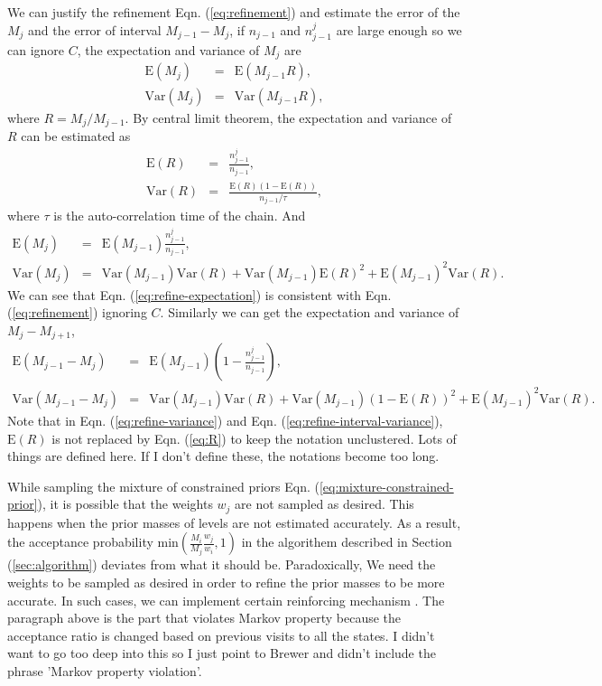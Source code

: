 \documentclass[letterpaper, preprint]{aastex}
\newcommand{\qer}[1]{{\color{red}#1}}
\begin{document}
We can justify the refinement Eqn. (\ref{eq:refinement}) and estimate the error of the $M_j$ and the error of interval $M_{j-1}-M_{j}$, if $n_{j-1}$ and $n_{j-1}^j$ are large enough so we can ignore $C$, the expectation and variance of $M_j$ are
\begin{eqnarray*}
\mathrm{E}(M_j) &=& \mathrm{E}(M_{j-1}R),\label{eq:R}\\
\mathrm{Var}(M_j)& =&\mathrm{Var}(M_{j-1}R),
\end{eqnarray*}
where $R = M_j/M_{j-1}$. By central limit theorem, the expectation and variance of $R$ can be estimated as
\begin{eqnarray}
\mathrm{E}(R) & = & \frac{n_{j-1}^j}{n_{j-1}},\\
\mathrm{Var}(R) & = & \frac{\mathrm{E}(R)\left(1-\mathrm{E}(R)\right)}{n_{j-1}/\tau},
\end{eqnarray}
where $\tau$ is the auto-correlation time of the chain. And
\begin{eqnarray}
\mathrm{E}(M_j) &=& \mathrm{E}(M_{j-1}) \frac{n_{j-1}^j}{n_{j-1}}, \label{eq:refine-expectation}\\
\mathrm{Var}(M_j) &=& \mathrm{Var}(M_{j-1})\mathrm{Var}(R)+ \mathrm{Var}(M_{j-1})\mathrm{E}(R)^2+\mathrm{E}(M_{j-1})^2\mathrm{Var}(R).\label{eq:refine-variance}
\end{eqnarray}
We can see that Eqn. (\ref{eq:refine-expectation}) is consistent with Eqn. (\ref{eq:refinement}) ignoring $C$. Similarly we can get the expectation and variance of $M_j-M_{j+1}$,
\begin{eqnarray}
\mathrm{E}(M_{j-1}-M_{j}) &=& \mathrm{E}(M_{j-1}) \left(1-\frac{n_{j-1}^j}{n_{j-1}}\right), \label{eq:refine-interval-expectation}\\
\mathrm{Var}(M_{j-1}-M_{j}) &=& \mathrm{Var}(M_{j-1})\mathrm{Var}(R)+ \mathrm{Var}(M_{j-1})\left(1-\mathrm{E}(R)\right)^2+\mathrm{E}(M_{j-1})^2\mathrm{Var}(R).\label{eq:refine-interval-variance}
\end{eqnarray}
Note that in Eqn. (\ref{eq:refine-variance}) and Eqn. (\ref{eq:refine-interval-variance}), $\mathrm{E}(R)$ is not replaced by Eqn. (\ref{eq:R}) to keep the notation unclustered. \qer{Lots of things are defined here. If I don't define these, the notations become too long.}

While sampling the mixture of constrained priors Eqn. (\ref{eq:mixture-constrained-prior}), it is possible that the weights $w_j$ are not sampled as desired. This happens when the prior masses of levels are not estimated accurately. As a result, the acceptance probability $\mathrm{min}\left(\frac{M_i}{M_j}\frac{w_j}{w_i},1\right)$ in the algorithem described in Section (\ref{sec:algorithm}) deviates from what it should be. Paradoxically, We need the weights to be sampled as desired in order to refine the prior masses to be more accurate. In such cases, we can implement certain reinforcing mechanism \citep{brewer11a}.
\qer{The paragraph above is the part that violates Markov property because the acceptance ratio is changed based on previous visits to all the states. I didn't want to go too deep into this so I just point to Brewer and didn't include the phrase 'Markov property violation'.}
\end{document}
